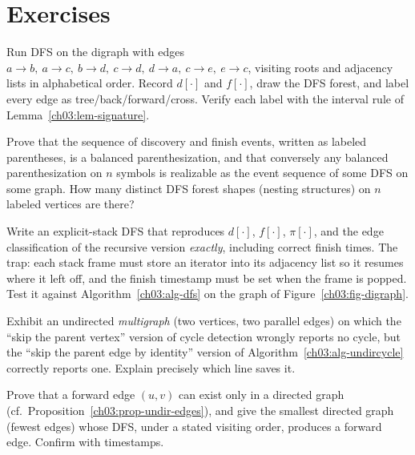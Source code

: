 \section{Exercises}
\label{ch03:exercises}

\begin{exercise}\label{ch03:ex-trace}
Run DFS on the digraph with edges $a\to b,\ a\to c,\ b\to d,\ c\to d,\ d\to a,\ c\to e,\ e\to c$, visiting roots and adjacency lists in alphabetical order. Record $d[\cdot]$ and $f[\cdot]$, draw the DFS forest, and label every edge as tree/back/forward/cross. Verify each label with the interval rule of Lemma~\ref{ch03:lem-signature}.
\end{exercise}

\begin{exercise}\label{ch03:ex-paren}
Prove that the sequence of discovery and finish events, written as labeled parentheses, is a balanced parenthesization, and that conversely any balanced parenthesization on $n$ symbols is realizable as the event sequence of some DFS on some graph. How many distinct DFS forest shapes (nesting structures) on $n$ labeled vertices are there?
\end{exercise}

\begin{exercise}\label{ch03:ex-iterative}
Write an explicit-stack DFS that reproduces $d[\cdot]$, $f[\cdot]$, $\pi[\cdot]$, and the edge classification of the recursive version \emph{exactly}, including correct finish times. The trap: each stack frame must store an iterator into its adjacency list so it resumes where it left off, and the finish timestamp must be set when the frame is popped. Test it against Algorithm~\ref{ch03:alg-dfs} on the graph of Figure~\ref{ch03:fig-digraph}.
\end{exercise}

\begin{exercise}\label{ch03:ex-break}
Exhibit an undirected \emph{multigraph} (two vertices, two parallel edges) on which the ``skip the parent vertex'' version of cycle detection wrongly reports no cycle, but the ``skip the parent edge by identity'' version of Algorithm~\ref{ch03:alg-undircycle} correctly reports one. Explain precisely which line saves it.
\end{exercise}

\begin{exercise}\label{ch03:ex-fwd}
Prove that a forward edge $(u,v)$ can exist only in a directed graph (cf.\ Proposition~\ref{ch03:prop-undir-edges}), and give the smallest directed graph (fewest edges) whose DFS, under a stated visiting order, produces a forward edge. Confirm with timestamps.
\end{exercise}

